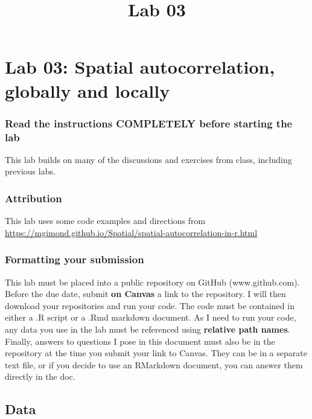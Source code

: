 \documentclass[]{article}
\title{Lab 03}
\author{}
\date{}
\makeatletter
\renewcommand{\maketitle}{\bgroup\vspace*{-1cm}\setlength{\parindent}{0pt}
\begin{flushleft}
  \@author
  
  \@date
  
\end{flushleft}\egroup
}
\makeatother
\begin{document}
\maketitle

\section{Lab 03: Spatial autocorrelation, globally and
locally}\label{lab-03-spatial-autocorrelation-globally-and-locally}

\subsubsection{Read the instructions COMPLETELY before starting the
lab}\label{read-the-instructions-completely-before-starting-the-lab}

This lab builds on many of the discussions and exercises from class,
including previous labs.

\subsubsection{Attribution}\label{attribution}

This lab uses some code examples and directions from
\url{https://mgimond.github.io/Spatial/spatial-autocorrelation-in-r.html}

\subsubsection{Formatting your
submission}\label{formatting-your-submission}

This lab must be placed into a public repository on GitHub
(www.github.com). Before the due date, submit \textbf{on Canvas} a link
to the repository. I will then download your repositories and run your
code. The code must be contained in either a .R script or a .Rmd
markdown document. As I need to run your code, any data you use in the
lab must be referenced using \textbf{relative path names}. Finally,
answers to questions I pose in this document must also be in the
repository at the time you submit your link to Canvas. They can be in a
separate text file, or if you decide to use an RMarkdown document, you
can answer them directly in the doc.

\subsection{Data}\label{data}
\end{document}
